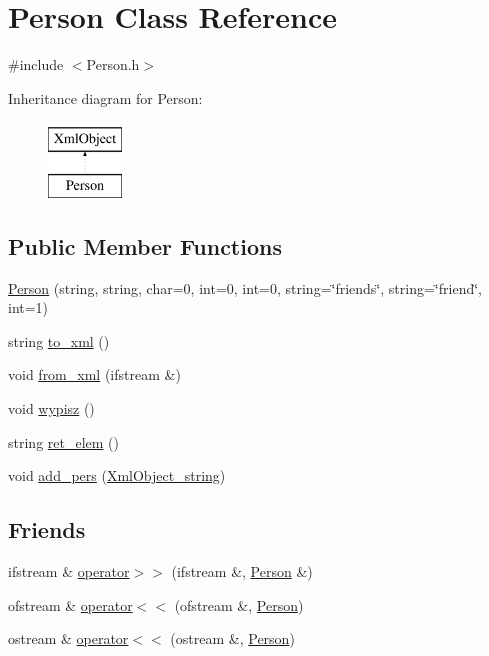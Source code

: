 \hypertarget{classPerson}{\section{Person Class Reference}
\label{classPerson}
}


{\ttfamily \#include $<$Person.\-h$>$}

Inheritance diagram for Person\-:\begin{figure}[H]
\begin{center}
\leavevmode
\includegraphics[height=2.000000cm]{classPerson}
\end{center}
\end{figure}
\subsection*{Public Member Functions}
\begin{DoxyCompactItemize}
\item 
\hyperlink{classPerson_a709471c96e7285da132e771e5b319149}{Person} (string, string, char=0, int=0, int=0, string=\char`\"{}friends\char`\"{}, string=\char`\"{}friend\char`\"{}, int=1)
\item 
string \hyperlink{classPerson_a1765bb0876c1fcf995641b35a8b65f54}{to\-\_\-xml} ()
\item 
void \hyperlink{classPerson_aea7c2872014913c743b863a11927cb79}{from\-\_\-xml} (ifstream \&)
\item 
void \hyperlink{classPerson_ad3cdf9ec902f7b024d16534934ce4be0}{wypisz} ()
\item 
string \hyperlink{classPerson_a9826c568c7042e276014b5265a696295}{ret\-\_\-elem} ()
\item 
void \hyperlink{classPerson_a69f7f76d5a500cc45292f25f4ccc9de7}{add\-\_\-pers} (\hyperlink{classXmlObject__string}{Xml\-Object\-\_\-string})
\end{DoxyCompactItemize}
\subsection*{Friends}
\begin{DoxyCompactItemize}
\item 
ifstream \& \hyperlink{classPerson_ac0b416688c8a0b4d3088639af70e83f9}{operator$>$$>$} (ifstream \&, \hyperlink{classPerson}{Person} \&)
\item 
ofstream \& \hyperlink{classPerson_af1cfee572bae052b68a2828ae6a8afb1}{operator$<$$<$} (ofstream \&, \hyperlink{classPerson}{Person})
\item 
ostream \& \hyperlink{classPerson_aba72915725aa68efe29811edaa685801}{operator$<$$<$} (ostream \&, \hyperlink{classPerson}{Person})
\end{DoxyCompactItemize}


